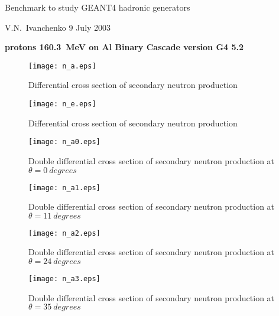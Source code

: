 \documentclass[12pt]{article}
\begin{document}
\pagestyle{empty}

\begin{center}
{\large Benchmark to study GEANT4 hadronic generators}

\vspace*{5mm}
{V.N.~Ivanchenko 9 July 2003}

\vspace*{5mm}


\vspace*{5mm}

{\bf protons 160.3~MeV on Al Binary Cascade version G4 5.2}

\vspace*{1mm}


\end{center}


\begin{figure}[htbp]
\caption{Differential cross section of secondary neutron production}
\label{fig10}
\centerline{\texttt{[image: n\_a.eps]}}
\end{figure}

\begin{figure}[htbp]
\caption{Differential cross section of secondary neutron production}
\label{fig7}
\centerline{\texttt{[image: n\_e.eps]}}
\end{figure}




\clearpage


\begin{figure}[htbp]
\caption{Double differential cross section of secondary neutron production at $\theta = 0~degrees$}
\label{figa0}
\centerline{\texttt{[image: n\_a0.eps]}}
\end{figure}

\begin{figure}[htbp]
\caption{Double differential cross section of secondary neutron production at $\theta = 11~degrees$}
\label{figa1}
\centerline{\texttt{[image: n\_a1.eps]}}
\end{figure}

\begin{figure}[htbp]
\caption{Double differential cross section of secondary neutron production at $\theta = 24~degrees$}
\label{figa2}
\centerline{\texttt{[image: n\_a2.eps]}}
\end{figure}

\clearpage

\begin{figure}[htbp]
\caption{Double differential cross section of secondary neutron production at $\theta = 35~degrees$}
\label{figa3}
\centerline{\texttt{[image: n\_a3.eps]}}
\end{figure}
\end{document}
